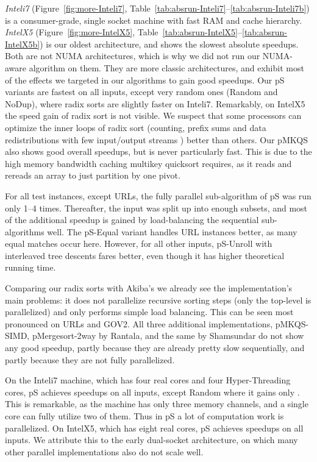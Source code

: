\documentclass[a4paper]{myjournal}
\begin{document}
\emph{Inteli7} (Figure~\ref{fig:more-Inteli7}, Table~\ref{tab:absrun-Inteli7}--\ref{tab:absrun-Inteli7b}) is a consumer-grade, single
socket machine with fast RAM and cache hierarchy. \emph{IntelX5}
(Figure~\ref{fig:more-IntelX5}, Table~\ref{tab:absrun-IntelX5}--\ref{tab:absrun-IntelX5b}) is our oldest architecture, and shows the
slowest absolute speedups. Both are not NUMA architectures, which is why we did
not run our NUMA-aware algorithm on them. They are more classic architectures,
and exhibit most of the effects we targeted in our algorithms to gain good
speedups. Our pS variants are fastest on all inputs, except very random ones
(Random and NoDup), where radix sorts are slightly faster on Inteli7.
Remarkably, on IntelX5 the speed gain of radix sort is not visible.  We suspect
that some processors can optimize the inner loops of radix sort (counting,
prefix sums and data redistributions with few input/output streams
\cite{karkkainen2009engineering}) better than others.  Our pMKQS also shows good
overall speedups, but is never particularly fast.  This is due to the high
memory bandwidth caching multikey quicksort requires, as it reads and rereads an
array to just partition by one pivot.

For all test instances, except URLs, the fully parallel sub-algorithm of pS
was run only 1--4 times. Thereafter, the input was split up into enough subsets,
and most of the additional speedup is gained by load-balancing the sequential
sub-algorithms well. The pS-Equal variant handles URL instances better, as
many equal matches occur here. However, for all other inputs, pS-Unroll with
interleaved tree descents fares better, even though it has higher theoretical
running time.

Comparing our radix sorts with Akiba's we already see the implementation's main
problems: it does not parallelize recursive sorting steps (only the top-level is
parallelized) and only performs simple load balancing. This can be seen most
pronounced on URLs and GOV2.  All three additional implementations, pMKQS-SIMD,
pMergesort-2way by Rantala, and the same by Shamsundar do not show any good
speedup, partly because they are already pretty slow sequentially, and partly
because they are not fully parallelized.

On the Inteli7 machine, which has four real cores and four Hyper-Threading
cores, pS achieves speedups  on all inputs, except Random where it
gains only . This is remarkable, as the machine has only three memory
channels, and a single core can fully utilize two of them. Thus in pS a lot
of computation work is parallelized. On IntelX5, which has eight real cores,
pS achieves speedups  on all inputs. We attribute this to the early
dual-socket architecture, on which many other parallel implementations also do
not scale well.
\end{document}
